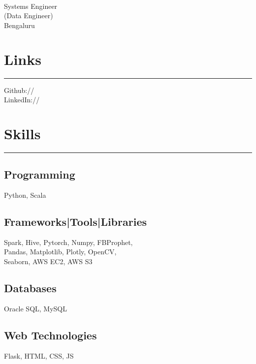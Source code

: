 \documentclass[]{puneet-resume}
\begin{document}
%
%

\begin{minipage}[t]{0.33\textwidth} 
\begin{large}
	\\
\end{large}
Systems Engineer\\
(Data Engineer)\\
Bengaluru
\hspace*{1pt}\hfill    \\
\section{Links} 
\noindent\rule{5cm}{0.4pt}

Github:// \href{https://github.com/puneet29}{} \\
LinkedIn://  \href{https://www.linkedin.com/in/geekpuneet}{} \\
\section{Skills}
\noindent\rule{5cm}{0.4pt}
\subsection{Programming}
Python, Scala
\vspace{6pt}
\subsection{Frameworks|Tools|Libraries}
Spark, Hive, Pytorch, Numpy, FBProphet,\\
Pandas, Matplotlib, Plotly, OpenCV,\\
Seaborn, AWS EC2, AWS S3
\vspace{6pt}
\subsection{Databases}
Oracle SQL, MySQL
\vspace{6pt}
\subsection{Web Technologies}
Flask, HTML, CSS, JS
\vspace{6pt}

\end{minipage}
\end{document}
